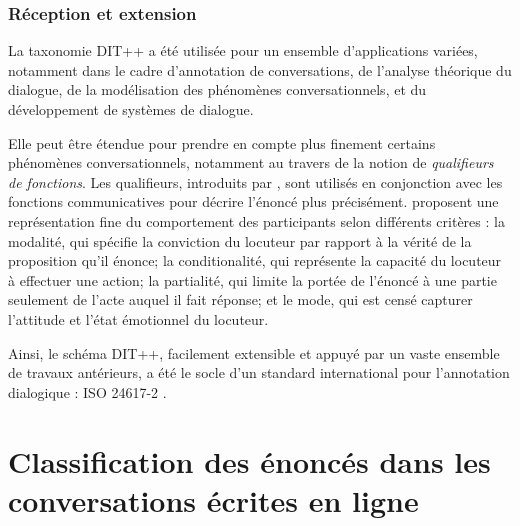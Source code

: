 \documentclass[10pt,a4paper,twoside]{article}
\begin{document}
\subsubsection{Réception et extension}

La taxonomie DIT++ a été utilisée pour un ensemble d'applications variées, notamment dans le cadre d'annotation de conversations, de l'analyse théorique du dialogue, de la modélisation des phénomènes conversationnels, et du développement de systèmes de dialogue. 

Elle peut être étendue pour prendre en compte plus finement certains phénomènes conversationnels, notamment au travers de la notion de \textit{qualifieurs de fonctions}. Les qualifieurs, introduits par \citet{petukhova2010introducing}, sont utilisés en conjonction avec les fonctions communicatives pour décrire l'énoncé plus précisément. \citeauthor{petukhova2010introducing} proposent une représentation fine du comportement des participants selon différents critères : la modalité, qui spécifie la conviction du locuteur par rapport à la vérité de la proposition qu'il énonce; la conditionalité, qui représente la capacité du locuteur à effectuer une action; la partialité, qui limite la portée de l'énoncé à une partie seulement de l'acte auquel il fait réponse; et le mode, qui est censé capturer l'attitude et l'état émotionnel du locuteur.

Ainsi, le schéma DIT++, facilement extensible et appuyé par un vaste ensemble de travaux antérieurs, a été le socle d'un standard international pour l'annotation dialogique : ISO 24617-2 \cite{bunt2012iso}.

\section{Classification des énoncés dans les conversations écrites en ligne }
\label{sec:online_written_conversation_analysis}
\end{document}
